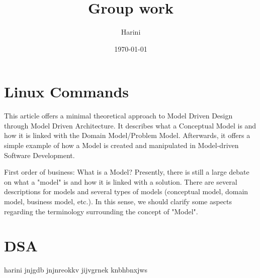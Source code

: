 \documentclass{article}
\title{Group work}
\date{\today}
\author{Harini}
\begin{document}
\maketitle

\section{Linux Commands}

This article offers a minimal theoretical approach to Model Driven Design through Model Driven Architecture. It describes what a Conceptual Model is and how it is linked with the Domain Model/Problem Model. Afterwards, it offers a simple example of how a Model is created and manipulated in Model-driven Software Development.

First order of business: What is a Model? Presently, there is still a large debate on what a "model" is and how it is linked with a solution. There are several descriptions for models and several types of models (conceptual model, domain model, business model, etc.). In this sense, we should clarify some aspects regarding the terminology surrounding the concept of "Model".

\newpage

\section{DSA}

harini  jnjgdb jnjnreokkv jijvgrnek knbhbnxjws
\end{document}
